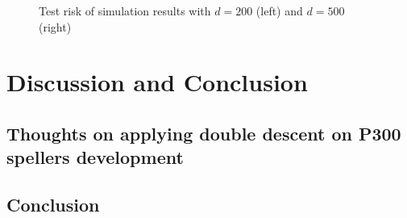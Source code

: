 \documentclass{article}
\begin{document}
\vspace{-5mm}
\begin{figure}[H]
	\centering
	\qquad
	\hspace{-8mm}
	\caption{Test risk of simulation results with $d=200$ (left) and $d=500$ (right)}
	\label{fig:2}
\end{figure}


\section{Discussion and Conclusion} \label{Conclusion}
\subsection{Thoughts on applying double descent on P300 spellers development}


\subsection{Conclusion}	




\end{document}

